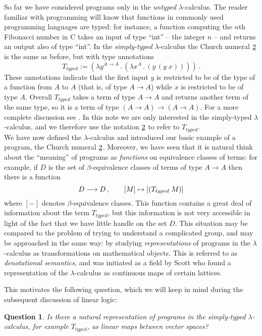 \documentclass[english,letter paper,12pt,reqno]{article}
\theoremstyle{example}
\newtheorem{question}[theorem]{Question}
\numberwithin{equation}{section}
\begin{document}
So far we have considered programs only in the \emph{untyped} $\lambda$-calculus. The reader familiar with programming will know that functions in commonly used programming languages are typed: for instance, a function computing the $n$th Fibonacci number in C takes an input of type ``int'' -- the integer $n$ -- and returns an output also of type ``int''. In the \emph{simply-typed} $\lambda$-calculus the Church numeral $\underline{2}$ is the same as before, but with type annotations
\[
T_{typed} := ( \lambda y^{A \rightarrow A} \,.\, ( \lambda x^A \,.\, (y \,(y \; x))))\,.
\]
These annotations indicate that the first input $y$ is restricted to be of the type of a function from $A$ to $A$ (that is, of type $A \rightarrow A$) while $x$ is restricted to be of type $A$. Overall $T_{typed}$ takes a term of type $A \rightarrow A$ and returns another term of the same type, so it is a term of type $(A \rightarrow A) \rightarrow (A \rightarrow A)$. For a more complete discussion see \cite[\S 6]{selinger}. In this note we are only interested in the simply-typed $\lambda$-calculus, and we therefore use the notation $\underline{2}$ to refer to $T_{typed}$.
\\

We have now defined the $\lambda$-calculus and introduced our basic example of a program, the Church numeral $\underline{2}$. Moreover, we have seen that it is natural think about the ``meaning'' of programs as \emph{functions} on equivalence classes of terms: for example, if $D$ is the set of $\beta$-equivalence classes of terms of type $A \rightarrow A$ then there is a function
\[
D \longrightarrow D\,, \qquad [M] \mapsto [(T_{typed} \; M)]
\]
where $[-]$ denotes $\beta$-equivalence classes. This function contains a great deal of information about the term $T_{typed}$, but this information is not very accessible in light of the fact that we have little handle on the set $D$. This situation may be compared to the problem of trying to understand a complicated group, and may be approached in the same way: by studying \emph{representations} of programs in the $\lambda$-calculus as transformations on mathematical objects. This is referred to as \emph{denotational semantics}, and was initiated as a field by Scott \cite{scott} who found a representation of the $\lambda$-calculus as continuous maps of certain lattices.

This motivates the following question, which we will keep in mind during the subsequent discussion of linear logic:

\begin{question}\label{question:lambda} Is there a natural representation of programs in the simply-typed $\lambda$-calculus, for example $T_{typed}$, as linear maps between vector spaces?
\end{question}
\end{document}
